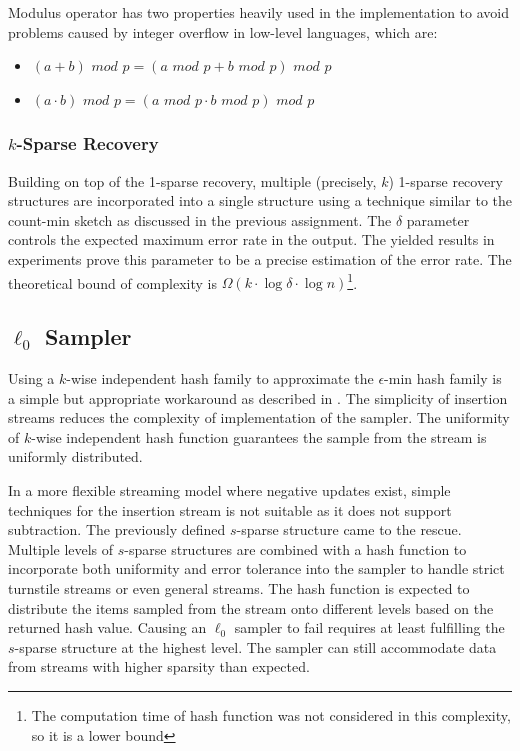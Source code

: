 \documentclass[a4paper, 11pt]{article}
\begin{document}
                Modulus operator has two properties heavily used in the implementation to avoid problems caused by integer overflow in low-level languages, which are:
                \begin{itemize}
                    \item $\left( a + b \right) \textit{ mod } p = \left( a \textit{ mod } p + b \textit{ mod } p \right) \textit{ mod } p$
                    \item $\left( a \cdot b \right) \textit{ mod } p = \left( a \textit{ mod } p \cdot b \textit{ mod } p \right) \textit{ mod } p$
                \end{itemize}
            \subsubsection{$k$-Sparse Recovery}
                Building on top of the 1-sparse recovery, multiple (precisely, $k$) 1-sparse recovery structures are incorporated into a single structure using a technique similar to the count-min sketch as discussed in the previous assignment. The $\delta$ parameter controls the expected maximum error rate in the output. The yielded results in experiments prove this parameter to be a precise estimation of the error rate. The theoretical bound of complexity is $\Omega \left( k \cdot \log{\delta} \cdot \log{n} \right)$\footnote{The computation time of hash function was not considered in this complexity, so it is a lower bound}.
        \subsection{$\ell_{0}$ Sampler}
            Using a $k$-wise independent hash family to approximate the $\epsilon$-min hash family is a simple but appropriate workaround as described in \cite{INDYK200184}. The simplicity of insertion streams reduces the complexity of implementation of the sampler. The uniformity of $k$-wise independent hash function guarantees the sample from the stream is uniformly distributed.

            In a more flexible streaming model where negative updates exist, simple techniques for the insertion stream is not suitable as it does not support subtraction. The previously defined $s$-sparse structure came to the rescue. Multiple levels of $s$-sparse structures are combined with a hash function to incorporate both uniformity and error tolerance into the sampler to handle strict turnstile streams or even general streams. The hash function is expected to distribute the items sampled from the stream onto different levels based on the returned hash value. Causing an $\ell_{0}$ sampler to fail requires at least fulfilling the $s$-sparse structure at the highest level. The sampler can still accommodate data from streams with higher sparsity than expected.
\end{document}
